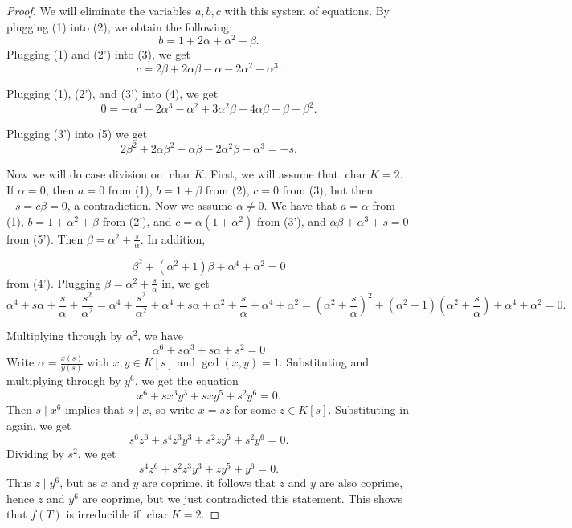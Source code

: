\documentclass{article}
\theoremstyle{customplain}
\theoremstyle{customdef}
\DeclareMathOperator{\Char}{\mathrm{char}}
\theoremstyle{definition} %
\begin{document}
\begin{proof}
We will eliminate the variables $a,b,c$ with this system of equations. By plugging (1) into (2), we obtain the following:
\begin{equation}
    b=1+2\alpha + \alpha^2-\beta. \tag{2'}
\end{equation}
Plugging (1) and (2') into (3), we get 
\begin{equation}
    c=2\beta+2\alpha\beta - \alpha - 2\alpha^2-\alpha^3. \tag{3'}
\end{equation}

Plugging (1), (2'), and (3') into (4), we get
\begin{equation}
    0=-\alpha^4-2\alpha^3-\alpha^2+3\alpha^2\beta+4\alpha \beta +\beta-\beta^2. \tag{4'}
\end{equation}

Plugging (3') into (5) we get 
\begin{equation}
    2\beta^2+2\alpha\beta^2-\alpha\beta-2\alpha^2\beta-\alpha^3 = -s. \tag{5'}
\end{equation}

Now we will do case division on $\Char K$. First, we will assume that $\Char K = 2$. If $\alpha = 0$, then $a=0$ from (1), $b=1+\beta$ from (2), $c=0$ from (3), but then $-s = c\beta = 0$, a contradiction. Now we assume $\alpha \ne 0.$ We have that $a=\alpha$ from (1), $b=1+\alpha^2+\beta$ from (2'), and $c=\alpha(1+\alpha^2)$ from (3'), and $\alpha \beta +\alpha^3 +s = 0$ from (5'). Then $\beta = \alpha^2+\frac{s}{\alpha}$. In addition,

\[
\beta^2+(\alpha^2+1) \beta + \alpha^4+\alpha^2=0
\]
from (4'). Plugging $\beta = \alpha^2+\frac{s}{\alpha}$ in, we get
\[
\alpha^4+s\alpha+\frac{s}{\alpha}+\frac{s^2}{\alpha^2}=\alpha^4+\frac{s^2}{\alpha^2}+\alpha^4+s\alpha+\alpha^2+\frac{s}{\alpha}+\alpha^4+\alpha^2=(\alpha^2+\frac{s}{\alpha})^2+(\alpha^2+1) (\alpha^2+\frac{s}{\alpha})+\alpha^4+\alpha^2 = 0.
\]

Multiplying through by $\alpha^2$, we have
\[
\alpha^6+s\alpha^3+s\alpha+s^2 = 0
\]
Write $\alpha = \frac{x(s)}{y(s)}$ with $x,y\in K[s]$ and $\gcd(x,y)=1.$ Substituting and multiplying through by $y^6$, we get the equation
\[
x^6+sx^3y^3+sxy^5+s^2y^6=0.
\]
Then $s\mid x^6$ implies that $s\mid x$, so write $x=sz$ for some $z\in K[s].$ Substituting in again, we get
\[
s^6z^6+s^4z^3y^3+s^2zy^5+s^2y^6 = 0.
\]
Dividing by $s^2$, we get
\[
s^4z^6+s^2z^3y^3+zy^5+y^6=0.
\]
Thus $z\mid y^6$, but as $x$ and $y$ are coprime, it follows that $z$ and $y$ are also coprime, hence $z$ and $y^6$ are coprime, but we just contradicted this statement. This shows that $f(T)$ is irreducible if $\Char K = 2.$


\end{proof}
\end{document}
